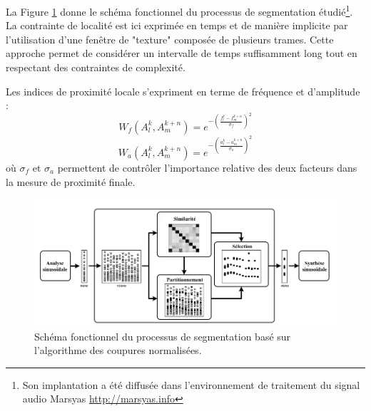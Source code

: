 La Figure \ref{fig:ncut} donne le schéma fonctionnel du processus de segmentation étudié\footnote{Son implantation a été diffusée dans l'environnement de traitement du signal audio Marsyas \url{http://marsyas.info}}. La contrainte de localité est ici exprimée en temps et de manière implicite par l'utilisation d'une fenêtre de "texture" composée de plusieurs trames. Cette approche permet de considérer un intervalle de temps suffisamment long tout en respectant des contraintes de complexité.

Les indices de proximité locale s'expriment en terme de fréquence et d'amplitude :
\begin{equation}
  W_f \left( A _ { l } ^ { k } , A _ { m } ^ { k + n } \right) = e ^ { - \left( \frac { f _ { l } ^ { k } - f _ { m } ^ { k + n } } { \sigma _ { f } } \right) ^ { 2 } }
\end{equation}
\begin{equation}
  W_a \left( A _ { l } ^ { k } , A _ { m } ^ { k + n } \right) =  e ^{ - \left( \frac { a _ { l } ^ { k } - a _ { m } ^ { k + n } } { \sigma _ { a } } \right) ^ { 2 } }
\end{equation}
où $\sigma _ { f }$ et $\sigma _ { a }$ permettent de contrôler l'importance relative des deux facteurs dans la mesure de proximité finale.

\begin{figure}[t]
  \includegraphics[width=1\textwidth]{figures/ncutDiagramFr.png}
  \caption{Schéma fonctionnel du processus de segmentation basé sur l'algorithme des coupures normalisées.}  \label{fig:ncut}
\end{figure}


